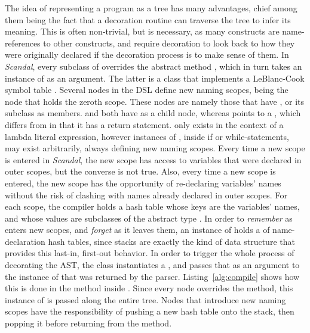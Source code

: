 The idea of representing a program as a tree has many advantages, chief among them being the fact that a decoration routine can traverse the tree to infer its meaning. This is often non-trivial, but is necessary, as many constructs are name-references to other constructs, and require decoration to look back to how they were originally declared if the decoration process is to make sense of them. In \emph{Scandal}, every subclass of  overrides the abstract method , which in turn takes an instance of  as an argument. The latter is a class that implements a LeBlanc-Cook symbol table \cite{Cook1983}. Several nodes in the DSL define new naming scopes,  being the node that holds the zeroth scope. These nodes are namely those that have , or its subclass  as members.  and  both have  as a child node, whereas  points to a , which differs from  in that it has a return statement.  only exists in the context of a lambda literal expression, however instances of , inside if or while-statements, may exist arbitrarily, always defining new naming scopes. Every time a new scope is entered in \emph{Scandal}, the new scope has access to variables that were declared in outer scopes, but the converse is not true. Also, every time a new scope is entered, the new scope has the opportunity of re-declaring variables' names without the risk of clashing with names already declared in outer scopes. For each scope, the compiler holds a hash table whose keys are the variables' names, and whose values are subclasses of the abstract type . In order to \emph{remember} as  enters new scopes, and \emph{forget} as it leaves them, an instance of  holds a  of name-declaration hash tables, since stacks are exactly the kind of data structure that provides this last-in, first-out behavior. In order to trigger the whole process of decorating the AST, the  class instantiates a , and passes that as an argument to the instance of  that was returned by the parser. Listing~\ref{alg:compile} shows how this is done in the  method inside . Since every node overrides the  method, this instance of  is passed along the entire tree. Nodes that introduce new naming scopes have the responsibility of pushing a new hash table onto the stack, then popping it before returning from the  method.

